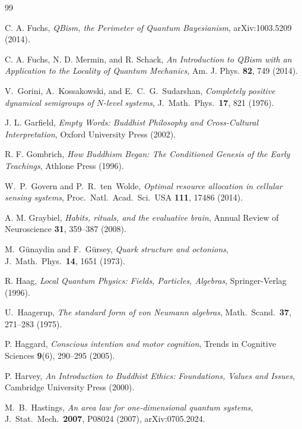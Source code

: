 \documentclass[12pt,a4paper,openany]{book}
\begin{document}
\begin{thebibliography}{99}

C. A. Fuchs, \emph{QBism, the Perimeter of Quantum Bayesianism}, arXiv:1003.5209 (2014).

C. A. Fuchs, N. D. Mermin, and R. Schack, \emph{An Introduction to QBism with an Application to the Locality of Quantum Mechanics}, Am. J. Phys. \textbf{82}, 749 (2014).

V.~Gorini, A.~Kossakowski, and E.~C.~G.~Sudarshan,
\emph{Completely positive dynamical semigroups of $N$-level systems},
J.\ Math.\ Phys.\ \textbf{17}, 821 (1976).

J. L. Garfield, \emph{Empty Words: Buddhist Philosophy and Cross-Cultural Interpretation}, Oxford University Press (2002).

R. F. Gombrich, \emph{How Buddhism Began: The Conditioned Genesis of the Early Teachings}, Athlone Press (1996).

W.~P.~Govern and P.~R.~ten~Wolde,
\emph{Optimal resource allocation in cellular sensing systems},
Proc.\ Natl.\ Acad.\ Sci.\ USA \textbf{111}, 17486 (2014).

A. M. Graybiel, \emph{Habits, rituals, and the evaluative brain}, Annual Review of Neuroscience \textbf{31}, 359--387 (2008).

M.~G\"unaydin and F.~G\"ursey, \emph{Quark structure and octonions}, J.\ Math.\ Phys.\ \textbf{14}, 1651 (1973).

R. Haag, \emph{Local Quantum Physics: Fields, Particles, Algebras}, Springer-Verlag (1996).

U.~Haagerup,
\emph{The standard form of von Neumann algebras},
Math.\ Scand.\ \textbf{37}, 271--283 (1975).

P. Haggard, \emph{Conscious intention and motor cognition}, Trends in Cognitive Sciences \textbf{9}(6), 290--295 (2005).

P. Harvey, \emph{An Introduction to Buddhist Ethics: Foundations, Values and Issues}, Cambridge University Press (2000).


M.~B.~Hastings,
\emph{An area law for one-dimensional quantum systems},
J.\ Stat.\ Mech.\ \textbf{2007}, P08024 (2007),
arXiv:0705.2024.


\end{thebibliography}
\end{document}
